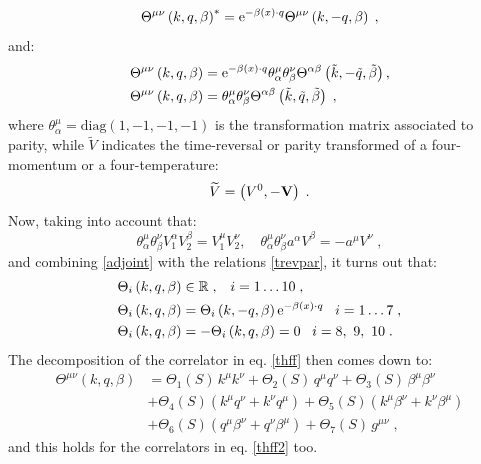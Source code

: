 \documentclass[prd,superscriptaddress,nofootinbib,notitlepage]{revtex4-1}
\newcommand{\e}{{\rm e}}
\begin{document}
%
\begin{equation}\label{adjoint}
 \Theta^{\mu\nu} \left(k,q,\beta\right)^*=
 \e^{-\beta(x)\cdot q}\Theta^{\mu\nu} \left(k,-q,\beta\right)\;,
\end{equation}
%
and:
%
\begin{subequations}\label{trevpar}
    \begin{align}
        \Theta^{\mu\nu} \left(k,q,\beta\right)&=\e^{-\beta(x)\cdot q}\theta^\mu_\alpha\theta^\nu_\beta 
        \Theta^{\alpha\beta} \left(\Tilde{k},-\Tilde{q},\Tilde{\beta}\right),\\
        \Theta^{\mu\nu} \left(k,q,\beta\right)&=\theta^\mu_\alpha\theta^\nu_\beta \Theta^{\alpha\beta} \left(\Tilde{k},\Tilde{q},\Tilde{\beta}\right)\;,
    \end{align}
\end{subequations}
%
where $\theta^\mu_\alpha=\mbox{diag}\left(1,-1,-1,-1\right)$ is the transformation matrix associated to parity, while 
$\widetilde{V}$ indicates the time-reversal or parity transformed of a four-momentum or a four-temperature:
%
$$
\widetilde{V}=\left(V^0,-{\bf V}\right)\;.
$$
%
Now, taking into account that:
%
\begin{equation*}
    \theta^\mu_\alpha\theta^\nu_\beta V^{\alpha}_1 V^{\beta}_2=V^\mu_1V^\nu_2,\quad \theta^\mu_\alpha\theta^\nu_\beta 
    a^{\alpha} V^{\beta}=-a^\mu V^\nu\;,
\end{equation*}
%
and combining \eqref{adjoint} with the relations \eqref{trevpar}, it turns out that:
%
\begin{subequations}\label{G q to meno q}
    \begin{align}
        \Theta_i\left(k,q,\beta\right)&\in\mathbb{R}\;,\;\;\;i=1\ldots10\;,\\
        \Theta_i\left(k,q,\beta\right)&=\Theta_i\left(k,-q,\beta\right)\e^{-\beta(x)\cdot q} \;\;\; i=1\ldots7\;,\\
      \Theta_i\left(k,q,\beta\right)&=-\Theta_i\left(k,q,\beta\right)=0 \;\;\; i=8,\ 9,\ 10\;.
    \end{align}
\end{subequations}
%
The decomposition of the correlator in eq. \eqref{thff} then comes down to:
%
\begin{equation}\label{inizialeT2}
    \begin{split}
 \Theta^{\mu\nu}(k,q,\beta)
        &=\Theta_1(S)\,k^\mu k^\nu+\Theta_2(S)\,q^\mu q^\nu
        +\Theta_3(S)\,\beta^\mu \beta^\nu \\
        &+\Theta_4(S)\left(k^\mu q^\nu + k^\nu q^\mu\right)
        + \Theta_5(S)\left(k^\mu \beta^\nu + k^\nu \beta^\mu\right) \\
        &+ \Theta_6(S)\left(q^\mu \beta^\nu + q^\nu \beta^\mu\right)
        + \Theta_7(S)\,g^{\mu\nu}\;,
\end{split}
\end{equation}
%
and this holds for the correlators in eq. \eqref{thff2} too.
\end{document}
